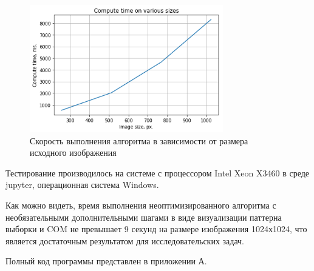 {{{{{   		\begin{figure}[H]
   			\centering                             
   			\includegraphics[width=0.75\textwidth,keepaspectratio]{daisy/compute_time.png}   
   			\centering\caption{ Скорость выполнения алгоритма в зависимости от размера исходного изображения }
   			\label{compute_time}                           
   		\end{figure}    
   	
   		Тестирование производилось на системе с процессором Intel Xeon X3460 в среде jupyter, операционная система Windows.
   		
   		Как можно видеть, время выполнения неоптимизированного алгоритма с необязательными дополнительными шагами в виде визуализации паттерна выборки и COM не превышает 9 секунд на размере изображения 1024х1024, что является достаточным результатом для исследовательских задач.
   		
   		Полный код программы представлен в приложении А.
   	}
\newpage



\titleformat{\section}{\large\bfseries\centering}{\thesection}{0.5em}{\MakeUppercase}
\titleformat{\subsection}[block]{\bfseries\hspace{1em}}{\thesubsection}{0.5em}{}

\newpage
{}
{}
}}}}
